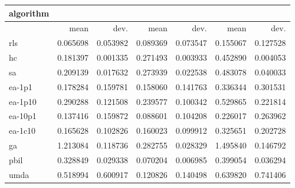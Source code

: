 \begin{tabular}{@{}l*{6}{>{{}}N{1}{2}}@{}}
\toprule
{algorithm} &  &  &  \\
\midrule
& {mean} & {dev.} & {mean} & {dev.} & {mean} & {dev.} \\
\midrule
rls & 0.065698 & 0.053982 & 0.089369 & 0.073547 & 0.155067 & 0.127528 \\
 hc & 0.181397 & 0.001335 & 0.271493 & 0.003933 & 0.452890 & 0.004053 \\
 sa & 0.209139 & 0.017632 & 0.273939 & 0.022538 & 0.483078 & 0.040033 \\
 ea-1p1 & 0.178284 & 0.159781 & 0.158060 & 0.141763 & 0.336344 & 0.301531 \\
 ea-1p10 & 0.290288 & 0.121508 & 0.239577 & 0.100342 & 0.529865 & 0.221814 \\
 ea-10p1 & 0.137416 & 0.159872 & 0.088601 & 0.104208 & 0.226017 & 0.263962 \\
 ea-1c10 & 0.165628 & 0.102826 & 0.160023 & 0.099912 & 0.325651 & 0.202728 \\
 ga & 1.213084 & 0.118736 & 0.282755 & 0.028329 & 1.495840 & 0.146792 \\
 pbil & 0.328849 & 0.029338 & 0.070204 & 0.006985 & 0.399054 & 0.036294 \\
 umda & 0.518994 & 0.600917 & 0.120826 & 0.140498 & 0.639820 & 0.741406 \\
 \bottomrule
\end{tabular}
